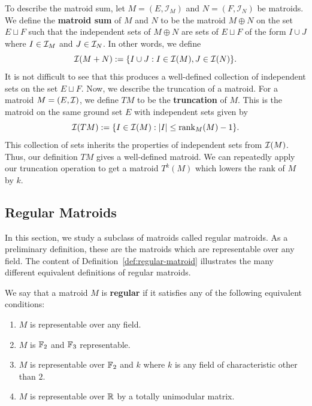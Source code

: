 \documentclass{puthesis-UG}
\begin{document}
To describe the matroid sum, let $M = (E, \mathcal{I}_M)$ and $N = (F, \mathcal{I}_N)$ be matroids. We define the \textbf{matroid sum} of $M$ and $N$ to be the matroid $M \oplus N$ on the set $E \sqcup F$ such that the independent sets of $M\oplus N$ are sets of $E \sqcup F$ of the form $I \cup J$ where $I \in \mathcal{I}_M$ and $J \in \mathcal{I}_N$. In other words, we define
\[
	\mathcal{I}(M+N) := \{I \cup J : I \in \mathcal{I}(M), J \in \mathcal{I}(N)\}.
\]
It is not difficult to see that this produces a well-defined collection of independent sets on the set $E \sqcup F$. Now, we describe the truncation of a matroid. For a matroid $M = (E, \mathcal{I})$, we define $TM$ to be the \textbf{truncation} of $M$. This is the matroid on the same ground set $E$ with independent sets given by 
\[
	\mathcal{I}(TM) := \{I \in \mathcal{I} (M) : |I| \leq \operatorname{rank}_M(M) - 1\}.
\]
This collection of sets inherits the properties of independent sets from $\mathcal{I}(M)$. Thus, our definition $TM$ gives a well-defined matroid. We can repeatedly apply our truncation operation to get a matroid $T^k(M)$ which lowers the rank of $M$ by $k$. 

\subsection{Regular Matroids} \label{sec:regular-matroids}

In this section, we study a subclass of matroids called regular matroids. As a preliminary definition, these are the matroids which are representable over any field. The content of Definition~\ref{def:regular-matroid} illustrates the many different equivalent definitions of regular matroids. 

\begin{defn} \label{def:regular-matroid}
	We say that a matroid $M$ is \textbf{regular} if it satisfies any of the following equivalent conditions:
	\begin{enumerate}[label = (\alph*)]
		\item $M$ is representable over any field. 
		\item $M$ is $\mathbb{F}_2$ and $\mathbb{F}_3$ representable. 
		\item $M$ is representable over $\mathbb{F}_2$ and $k$ where $k$ is any field of characteristic other than $2$.
		\item $M$ is representable over $\mathbb{R}$ by a totally unimodular matrix. 
	\end{enumerate}
\end{defn}
\end{document}
